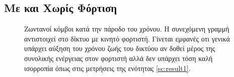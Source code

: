\subsection{Με και Χωρίς Φόρτιση}\label{subc:result5_1}
\begin{figure}[H]
  \centering
  \caption{Ζωντανοί κόμβοι κατά την πάροδο του χρόνου. Η συνεχόμενη γραμμή αντιστοιχεί στο δίκτυο με κινητό φορτιστή. Γίνεται εμφανές οτι γενικά υπάρχει αύξηση
	του χρόνου ζωής του δικτύου αν δοθεί μέρος της συνολικής ενέργειας στον φορτιστή αλλά δεν υπάρχει τόση καλή ισορροπία όπως στις μετρήσεις της ενότητας
\ref{sc:result1}.}
  \label{fig:5_1exp_1_1}
\end{figure}



